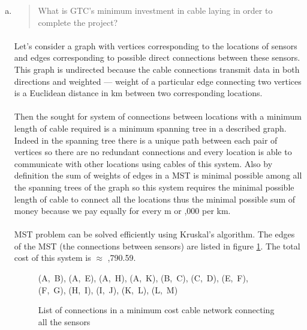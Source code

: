 \begin{enumerate}[(a)]
\item \begin{quote}What is GTC’s minimum investment in cable laying in order to complete the
project?\end{quote}

	\paragraph{}
	Let's consider a graph with vertices corresponding to the locations of sensors and edges corresponding to possible direct connections between these sensors. This graph is undirected because the cable connections transmit data in both directions and weighted --- weight of a particular edge connecting two vertices is a Euclidean distance in km between two corresponding locations.

	\paragraph{}
	Then the sought for system of connections between locations with a minimum length of cable required is a minimum spanning tree in a described graph. Indeed in the spanning tree there is a unique path between each pair of vertices so there are no redundant connections and every location is able to communicate with other locations using cables of this system. Also by definition the sum of weights of edges in a MST is minimal possible among all the spanning trees of the graph so this system requires the minimal possible length of cable to connect all the locations thus the minimal possible sum of money because we pay equally  for every m or ,000 per km.

	\paragraph{}
	MST problem can be solved efficiently using Kruskal's algorithm. The edges of the MST (the connections between sensors) are listed in figure \ref{mst2-6-a}. The total cost of this system is $\approx$ ,790.59.

\begin{figure}[H]
	\centering
\begin{center}
(A,~B), (A,~E), (A,~H), (A,~K), (B,~C), (C,~D), (E,~F), (F,~G), (H,~I), (I,~J), (K,~L), (L,~M)
\end{center}
	\caption{List of connections in a minimum cost cable network connecting all the sensors}
	\label{mst2-6-a}
\end{figure}


\end{enumerate}
